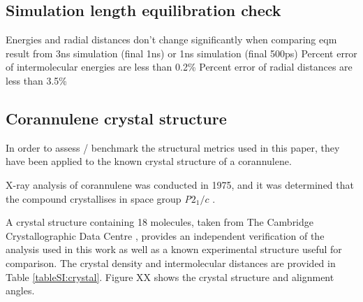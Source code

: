 

\subsection{Simulation length equilibration check}
Energies and radial distances don't change significantly when comparing eqm result from 3ns simulation (final 1ns) or 1ns simulation (final 500ps)
Percent error of intermolecular energies are less than 0.2\%
Percent error of radial distances are less than 3.5\%



\subsection{Corannulene crystal structure}
In order to assess / benchmark the structural metrics used in this paper, they have been applied to the known crystal structure of a corannulene. %

X-ray analysis of corannulene was conducted in 1975, and it was determined that the compound crystallises in space group \textit{P}$2_{1}/c$ \cite{hanson1976crystal}.

A crystal structure containing 18 molecules, taken from The Cambridge Crystallographic Data Centre \cite{CORANN11unitcell}, provides an independent verification of the analysis used in this work as well as a known experimental structure useful for comparison.  The crystal density and intermolecular distances are provided in Table \ref{tableSI:crystal}.  Figure XX shows the crystal structure and alignment angles.

